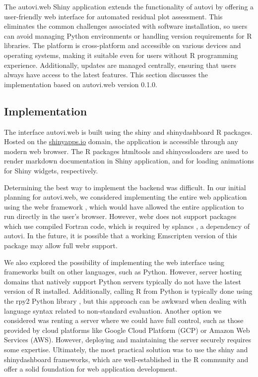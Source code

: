 \documentclass[
doublespace,
  times]{anzsauth}
\begin{document}
The \textsf{autovi.web} \textsf{Shiny} application extends the
functionality of \textsf{autovi} by offering a user-friendly web
interface for automated residual plot assessment. This eliminates the
common challenges associated with software installation, so users can
avoid managing \textsf{Python} environments or handling version
requirements for \textsf{R} libraries. The platform is cross-platform
and accessible on various devices and operating systems, making it
suitable even for users without \textsf{R} programming experience.
Additionally, updates are managed centrally, ensuring that users always
have access to the latest features. This section discusses the
implementation based on \textsf{autovi.web} version 0.1.0.

\subsection{Implementation}\label{implementation}

The interface \textsf{autovi.web} is built using the \textsf{shiny}
\citep{shiny} and \textsf{shinydashboard} \citep{shinydashboard}
\textsf{R} packages. Hosted on the
\href{https://www.shinyapps.io}{shinyapps.io} domain, the application is
accessible through any modern web browser. The \textsf{R} packages
\textsf{htmltools} \citep{htmltools} and \textsf{shinycssloaders}
\citep{shinycssloaders} are used to render markdown documentation in
\textsf{Shiny} application, and for loading animations for
\textsf{Shiny} widgets, respectively.

Determining the best way to implement the backend was difficult. In our
initial planning for \textsf{autovi.web}, we considered implementing the
entire web application using the \textsf{webr} framework \citep{webr},
which would have allowed the entire application to run directly in the
user's browser. However, \textsf{webr} does not support packages which
use compiled \textsf{Fortran} code, which is required by
\textsf{splancs} \citep{splancs}, a dependency of \textsf{autovi}. In
the future, it is possible that a working \textsf{Emscripten}
\citep{zakai2011emscripten} version of this package may allow full
\textsf{webr} support.

We also explored the possibility of implementing the web interface using
frameworks built on other languages, such as \textsf{Python}. However,
server hosting domains that natively support \textsf{Python} servers
typically do not have the latest version of \textsf{R} installed.
Additionally, calling \textsf{R} from \textsf{Python} is typically done
using the \textsf{rpy2} \textsf{Python} library \citep{rpy2}, but this
approach can be awkward when dealing with language syntax related to
non-standard evaluation. Another option we considered was renting a
server where we could have full control, such as those provided by cloud
platforms like Google Cloud Platform (GCP) or Amazon Web Services (AWS).
However, deploying and maintaining the server securely requires some
expertise. Ultimately, the most practical solution was to use the
\textsf{shiny} and \textsf{shinydashboard} frameworks, which are
well-established in the \textsf{R} community and offer a solid
foundation for web application development.
\end{document}
